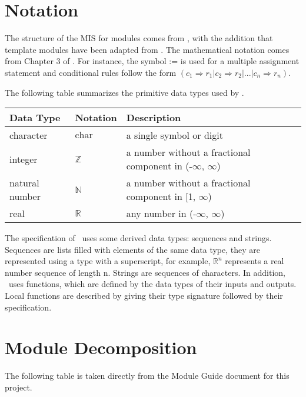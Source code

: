 \documentclass[12pt, titlepage]{article}
\begin{document}
\section{Notation}

The structure of the MIS for modules comes from \citet{HoffmanAndStrooper1995},
with the addition that template modules have been adapted from
\cite{GhezziEtAl2003}.  The mathematical notation comes from Chapter 3 of
\citet{HoffmanAndStrooper1995}.  For instance, the symbol := is used for a
multiple assignment statement and conditional rules follow the form $(c_1
\Rightarrow r_1 | c_2 \Rightarrow r_2 | ... | c_n \Rightarrow r_n )$.

The following table summarizes the primitive data types used by \progname. 

\begin{center}
\renewcommand{\arraystretch}{1.2}
\noindent 
\begin{tabular}{l l p{7.5cm}} 
\toprule 
\textbf{Data Type} & \textbf{Notation} & \textbf{Description}\\ 
\midrule
character & $\text{char}$ & a single symbol or digit\\
integer & $\mathbb{Z}$ & a number without a fractional component in (-$\infty$,
$\infty$) \\
natural number & $\mathbb{N}$ & a number without a fractional component in [1,
$\infty$) \\
real & $\mathbb{R}$ & any number in (-$\infty$, $\infty$)\\
\bottomrule
\end{tabular}
\end{center}

\noindent
The specification of \progname \ uses some derived data types: sequences and
strings. Sequences are lists filled with elements of the same data type, they
are represented using a type with a superscript, for example, $\mathbb{R}^n$
represents a real number sequence of length n. Strings are sequences of
characters. In addition, \progname \ uses functions, which are defined by the
data types of their inputs and outputs. Local functions are described by giving
their type signature followed by their specification.

\section{Module Decomposition}

The following table is taken directly from the Module Guide document for this
project.
\end{document}
